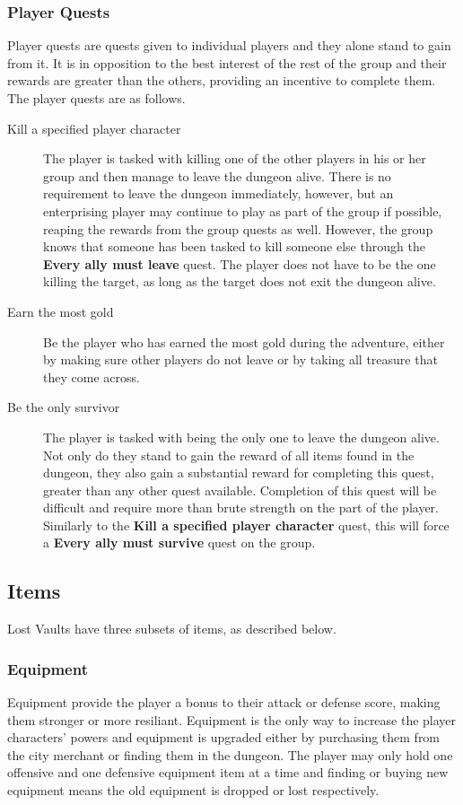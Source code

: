 \documentclass[a4paper]{article}
\begin{document}
\subsubsection{Player Quests}
Player quests are quests given to individual players and they alone stand to gain from it. It is in opposition to the best interest of the rest of the group and their rewards are 
greater than the others, providing an incentive to complete them. The player quests are as follows.
\begin{description}
\item[Kill a specified player character] The player is tasked with killing one of the other players in his or her group and then manage to leave the dungeon alive. There is no requirement to leave 
the dungeon immediately, however, but an enterprising player may continue to play as part of the group if possible, reaping the rewards from the group quests as well. However, the group 
knows that someone has been tasked to kill someone else through the \textbf{Every ally must leave} quest. The player does not have to be the one killing the target, as long as the target 
does not exit the dungeon alive.
\item[Earn the most gold] Be the player who has earned the most gold during the adventure, either by making sure other players do not leave or by taking all treasure that they come across.
\item[Be the only survivor] The player is tasked with being the only one to leave the dungeon alive. Not only do they stand to gain the reward of all items found in the dungeon, they also gain 
a substantial reward for completing this quest, greater than any other quest available. Completion of this quest will be difficult and require more than brute strength on the part of the player. 
Similarly to the \textbf{Kill a specified player character} quest, this will force a \textbf{Every ally must survive} quest on the group.
\end{description}
\subsection{Items}
Lost Vaults have three subsets of items, as described below.

\subsubsection{Equipment}
Equipment provide the player a bonus to their attack or defense score, making them stronger or more resiliant. Equipment is the only way to increase the player characters' powers and 
equipment is upgraded either by purchasing them from the city merchant or finding them in the dungeon. The player may only hold one offensive and one defensive equipment item at a time and 
finding or buying new equipment means the old equipment is dropped or lost respectively.
\end{document}
